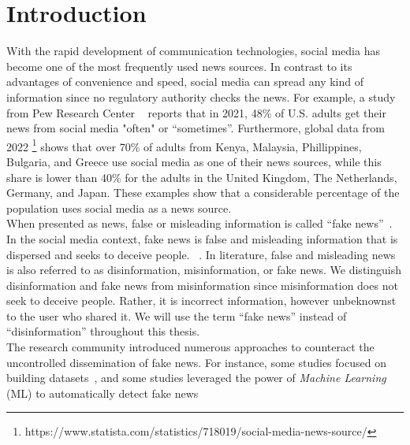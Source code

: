 
\chapter{Introduction}\label{chapter:introduction}

With the rapid development of communication technologies, social media has become one of the most frequently used news sources. In contrast
to its advantages of convenience and speed, social media can spread any kind of information since no regulatory authority checks the news.
For example, a study from Pew Research Center ~\parencite{NewsConsumptionAcrossSocialMedia_pewresearch}
reports that in 2021, 48\% of U.S. adults get their news from social media "often" or “sometimes”. Furthermore, global data from 2022
\footnote{https://www.statista.com/statistics/718019/social-media-news-source/} shows that over 70\% of adults from Kenya, Malaysia,
Phillippines, Bulgaria, and Greece use social media as one of their news sources, while this share is lower than 40\% for the
adults in the United Kingdom, The Netherlands, Germany, and Japan. These examples show that a considerable percentage of the population uses
social media as a news source.\\
When presented as news, false or misleading information is called “fake news”~\parencite{ThePsycologyOfFakeNews_Pennycook}. In the social media
context, fake news is false and misleading information that is dispersed and seeks to deceive people. ~\parencite{TheScienceOfFakeNews_Lazer}. In literature, false and misleading news is also referred to as disinformation, misinformation, or fake news. We distinguish disinformation and fake
news from misinformation since misinformation does not seek to deceive people. Rather, it is incorrect information, however unbeknownst to the user
who shared it. We will use the term “fake news” instead of “disinformation” throughout this thesis. \\
The research community introduced numerous approaches to counteract the uncontrolled dissemination of fake news. For instance, some studies
focused on building datasets~\parencite{FakeNewsDetectionOnSocialMediaADataMiningPerspective_Shu, LiarLiarPantsOnFire_Wang, FakeReddit_Nakamura, SomeLikeItHoaxDataset_Tacchini, BuzzfaceDataset_Santia, UPFD_Dataset_Shu}, and some studies leveraged the power of \emph{Machine Learning} (ML) to
automatically detect fake news~\parencite{FakeNewsDetectionUsingGeometricDeepLearning_Monti, GraphNeuralNetworksWithContinualLearningFakeNewsDetection_Han, RumorDetectionBidirectionalGraphConvolutionalNetworks_Bian, SAFEFND_Zhou}
